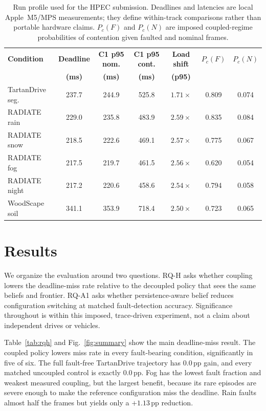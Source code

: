 \documentclass[conference]{IEEEtran}
\begin{document}
\begin{table}[t]
\caption{Run profile used for the HPEC submission. Deadlines and
latencies are local Apple~M5/MPS measurements; they define
within-track comparisons rather than portable hardware claims.
$P_c(F)$ and $P_c(N)$ are imposed coupled-regime probabilities of
contention given faulted and nominal frames.}
\label{tab:profile}
\centering
\scriptsize
\setlength{\tabcolsep}{3pt}
\begin{tabular}{lcccccc}
\toprule
\textbf{Condition} & \textbf{Deadline} &
\textbf{C1 p95 nom.} & \textbf{C1 p95 cont.} &
\textbf{Load shift} & \textbf{$P_c(F)$} & \textbf{$P_c(N)$} \\
 & \textbf{(ms)} & \textbf{(ms)} & \textbf{(ms)} &
\textbf{(p95)} & & \\
\midrule
TartanDrive seg. & 237.7 & 244.9 & 525.8 & $1.71\times$ & 0.809 & 0.074 \\
RADIATE rain     & 229.0 & 235.8 & 483.9 & $2.59\times$ & 0.835 & 0.084 \\
RADIATE snow     & 218.5 & 222.6 & 469.1 & $2.57\times$ & 0.775 & 0.067 \\
RADIATE fog      & 217.5 & 219.7 & 461.5 & $2.56\times$ & 0.620 & 0.054 \\
RADIATE night    & 217.2 & 220.6 & 458.6 & $2.54\times$ & 0.794 & 0.058 \\
WoodScape soil   & 341.1 & 353.9 & 718.4 & $2.50\times$ & 0.723 & 0.065 \\
\bottomrule
\end{tabular}
\end{table}

\section{Results}
\label{sec:results}

We organize the evaluation around two questions. RQ-H asks whether
coupling lowers the deadline-miss rate relative to the decoupled
policy that sees the same beliefs and frontier. RQ-A1 asks whether
persistence-aware belief reduces configuration switching at matched
fault-detection accuracy. Significance throughout is within this
imposed, trace-driven experiment, not a claim about independent
drives or vehicles.

Table~\ref{tab:rqh} and Fig.~\ref{fig:summary} show the main
deadline-miss result. The coupled policy lowers miss rate in every
fault-bearing condition, significantly in five of six. The full
fault-free TartanDrive trajectory has $0.0$\,pp gain, and every
matched uncoupled control is exactly $0.0$\,pp. Fog has the lowest
fault fraction and weakest measured coupling, but the largest
benefit, because its rare episodes are severe enough to make the
reference configuration miss the deadline. Rain faults almost half
the frames but yields only a $+1.13$\,pp reduction.
\end{document}
